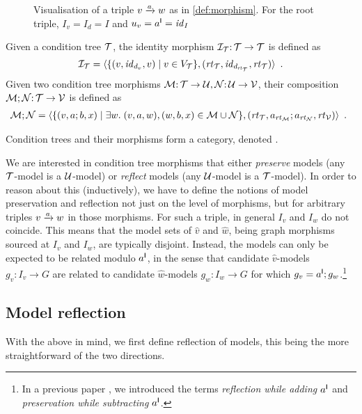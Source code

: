 \begin{figure}
\centering

\caption{Visualisation of a triple $\trip vaw$ as in \cref{def:morphism}. For the root triple, $I_v=I_d=I$ and $u_v=a^{\mathsf I}={\mathit{id}}_I$}
\label{fig:triple}
\end{figure}

\medskip\noindent
Given a condition tree ${\mathcal{T}}$, the identity morphism ${\mathcal{I}}_{\mathcal{T}}{:}\, {\mathcal{T}}\rightarrow{\mathcal{T}}$ is defined as
\[ {\mathcal{I}}_{\mathcal{T}} = \langle \{{{(v,{\mathit{id}}_{d_v},v)}\mid{v\in V_{\mathcal{T}}}}\},(\mathit{rt}_{{\mathcal{T}}},{\mathit{id}}_{d_{\mathit{rt}_{{\mathcal{T}}}}},\mathit{rt}_{{\mathcal{T}}})\rangle \enspace. \]
Given two condition tree morphisms ${\mathcal{M}}{:}\, {\mathcal{T}}\rightarrow {\mathcal{U}},{\mathcal{N}}{:}\, {\mathcal{U}}\rightarrow {\mathcal{V}}$, their composition ${\mathcal{M}};{\mathcal{N}}{:}\, {\mathcal{T}}\rightarrow {\mathcal{V}}$ is defined as
\[ \cM;\cN =
\begin{array}[t]{@{}l}
	\tupof{\setof{(v,a;b,x) \mid \exists w\st (v,a,w), (w,b,x)\in \cM\cup \cN},(\rt\cT,a_{\rt\cM};a_{\rt\cN},\rt\cV)} \enspace.
\end{array}
\]

\begin{proposition}
Condition trees and their morphisms form a category, denoted {\CT}.
\end{proposition}
%
We are interested in condition tree morphisms that either \emph{preserve} models (any ${\mathcal{T}}$-model is a ${\mathcal{U}}$-model) or \emph{reflect} models (any ${\mathcal{U}}$-model is a ${\mathcal{T}}$-model). In order to reason about this (inductively), we have to define the notions of model preservation and reflection not just on the level of morphisms, but for arbitrary triples $\trip vaw$ in those morphisms. For such a triple, in general $I_v$ and $I_w$ do not coincide. This means that the model sets of $\hat v$ and $\hat w$, being graph morphisms sourced at $I_v$ and $I_w$, are typically disjoint. Instead, the models can only be expected to be related modulo $a^{\mathsf I}$, in the sense that candidate $\hat v$-models $g_v:I_v\to G$ are related to candidate $\hat w$-models $g_w:I_w\to G$ for which $g_v=a^{\mathsf I};g_w$.\footnote{In a previous paper \cite{RensCorr}, we introduced the terms \emph{reflection while adding $a^{\mathsf I}$} and \emph{preservation while subtracting $a^{\mathsf I}$}.}

\subsection{Model reflection}

With the above in mind, we first define reflection of models, this being the more straightforward of the two directions.

